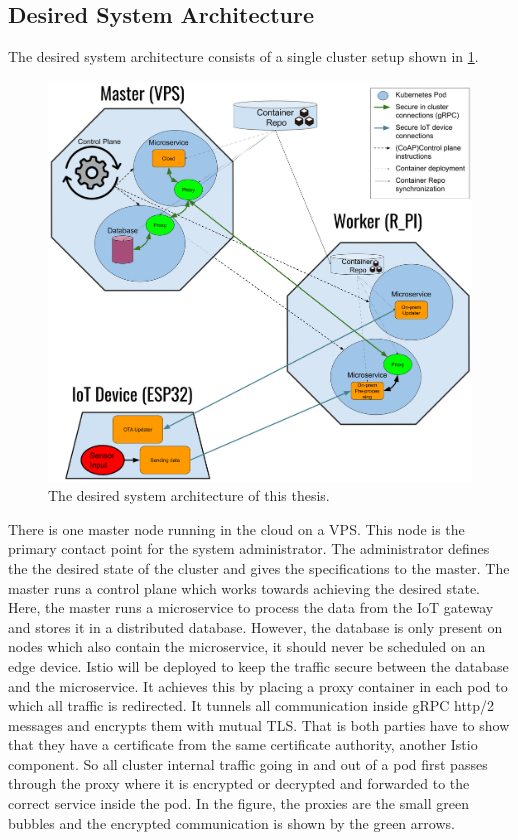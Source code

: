 \subsection{Desired System Architecture} \label{sec:desiredSystem}
The desired system architecture consists of a single cluster setup shown in \cref{fig:implementationSetup}.
\begin{figure}
    \centering
    \includegraphics[scale=0.25]{figures/implementationSetup.png}
    \caption{The desired system architecture of this thesis.}
    \label{fig:implementationSetup}
\end{figure}
There is one master node running in the cloud on a VPS. This node is the primary contact point for the system administrator. The administrator defines the the desired state of the cluster and gives the specifications to the master. The master runs a control plane which works towards achieving the desired state. Here, the master runs a microservice to process the data from the IoT gateway and stores it in a distributed database. However, the database is only present on nodes which also contain the microservice, it should never be scheduled on an edge device. Istio will be deployed to keep the traffic secure between the database and the microservice. It achieves this by placing a proxy container in each pod to which all traffic is redirected. It tunnels all communication inside gRPC http/2 messages and encrypts them with mutual TLS. That is both parties have to show that they have a certificate from the same certificate authority, another Istio component. So all cluster internal traffic going in and out of a pod first passes through the proxy where it is encrypted or decrypted and forwarded to the correct service inside the pod. In the figure, the proxies are the small green bubbles and the encrypted communication is shown by the green arrows.\\
